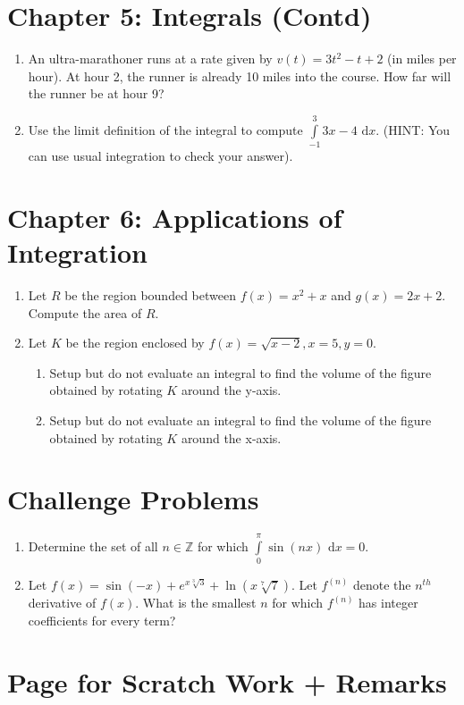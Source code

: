 \documentclass{article}
\begin{document}
\section*{Chapter 5: Integrals (Contd)}
\begin{enumerate}
    \item An ultra-marathoner runs at a rate given by $v(t) = 3t^2-t+2$ (in miles per hour). At hour 2, the runner is already 10 miles into the course. How far will the runner be at hour 9?
    \vfill
    \item Use the limit definition of the integral to compute $\int\limits_{-1}^3 3x-4 \text{ d}x$. (HINT: You can use usual integration to check your answer).
    \vfill
\end{enumerate}
\newpage
\section*{Chapter 6: Applications of Integration}
\begin{enumerate}
    \item Let $R$ be the region bounded between $f(x) = x^2+x$ and $g(x) = 2x+2$. Compute the area of $R$.
    \vfill
    \item Let $K$ be the region enclosed by $f(x) = \sqrt{x-2}, x=5, y=0$.
    \begin{enumerate}
        \item Setup but do not evaluate an integral to find the volume of the figure obtained by rotating $K$ around the y-axis.
        \item Setup but do not evaluate an integral to find the volume of the figure obtained by rotating $K$ around the x-axis.
    \end{enumerate}
    \vfill
\end{enumerate}
\newpage
\section*{Challenge Problems}
\begin{enumerate}
    \item Determine the set of all $n \in \mathbb{Z}$ for which $\int\limits_{0}^\pi \sin(nx) \text{ d}x = 0$.
    \vfill
    \item Let $f(x) = \sin(-x)+e^{x\sqrt[3]{3}}+\ln(x\sqrt[7]{7})$. Let $f^{(n)}$ denote the $n^{th}$ derivative of $f(x)$. What is the smallest $n$ for which $f^{(n)}$ has integer coefficients for every term?
    \vfill
\end{enumerate}
\newpage
\section*{Page for Scratch Work + Remarks}
\end{document}

